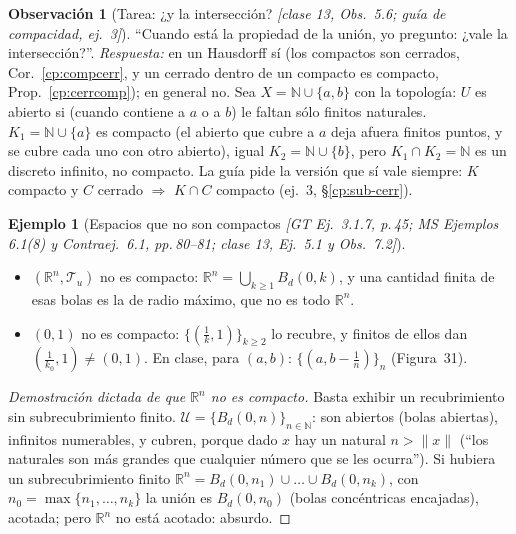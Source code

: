 \documentclass[11pt,a4paper]{article}
\newenvironment{lista}{\leavevmode\begin{itemize}[leftmargin=1.5em,itemsep=1pt,topsep=2pt,parsep=0pt]}{\end{itemize}}
\theoremstyle{definition}
\newtheorem{ejemplo}[definicion]{Ejemplo}
\newtheorem{observacion}[definicion]{Observación}
\theoremstyle{plain}
\newcommand{\fnt}[1]{{\normalfont\small\itshape\color{gray!150!black}[#1]}}
\newcommand{\R}{\mathbb{R}}
\newcommand{\N}{\mathbb{N}}
\newcommand{\Bola}[2]{B_d(#1,#2)}
\newcommand{\norm}[1]{\lVert #1 \rVert}
\newcommand{\tp}{\mathcal{T}}
\begin{document}
\begin{observacion}[Tarea: ¿y la intersección? \fnt{clase 13, Obs.\ 5.6; guía de compacidad, ej.\ 3}]
``Cuando está la propiedad de la unión, yo pregunto: ¿vale la intersección?''. \emph{Respuesta:} en un Hausdorff sí (los compactos son cerrados, Cor.~\ref{cp:compcerr}, y un cerrado dentro de un compacto es compacto, Prop.~\ref{cp:cerrcomp}); en general no. Sea $X=\N\cup\{a,b\}$ con la topología: $U$ es abierto si (cuando contiene a $a$ o a $b$) le faltan sólo finitos naturales. $K_1=\N\cup\{a\}$ es compacto (el abierto que cubre a $a$ deja afuera finitos puntos, y se cubre cada uno con otro abierto), igual $K_2=\N\cup\{b\}$, pero $K_1\cap K_2=\N$ es un discreto infinito, no compacto. La guía pide la versión que sí vale siempre: $K$ compacto y $C$ cerrado $\Rightarrow$ $K\cap C$ compacto (ej.~3, \S\ref{cp:sub-cerr}).
\end{observacion}

\begin{ejemplo}[Espacios que no son compactos \fnt{GT Ej.\ 3.1.7, p.\,45; MS Ejemplos 6.1(8) y Contraej.\ 6.1, pp.\,80--81; clase 13, Ej.\ 5.1 y Obs.\ 7.2}]\label{cp:nocomp}
\begin{lista}
\item $(\R^n,\tp_u)$ no es compacto: $\R^n=\bigcup_{k\ge1}\Bola{0}{k}$, y una cantidad finita de esas bolas es la de radio máximo, que no es todo $\R^n$.
\item $(0,1)$ no es compacto: $\{(\tfrac1k,1)\}_{k\ge2}$ lo recubre, y finitos de ellos dan $(\tfrac1{k_0},1)\ne(0,1)$. En clase, para $(a,b)$: $\{(a,b-\frac1n)\}_{n}$ (Figura~31).
\end{lista}
\end{ejemplo}

\begin{proof}[Demostración dictada de que $\R^n$ no es compacto]
Basta exhibir un recubrimiento sin subrecubrimiento finito. $\mathcal U=\{\Bola{0}{n}\}_{n\in\N}$: son abiertos (bolas abiertas), infinitos numerables, y cubren, porque dado $x$ hay un natural $n>\norm x$ (``los naturales son más grandes que cualquier número que se les ocurra''). Si hubiera un subrecubrimiento finito $\R^n=\Bola{0}{n_1}\cup\dots\cup\Bola{0}{n_k}$, con $n_0=\max\{n_1,\dots,n_k\}$ la unión es $\Bola{0}{n_0}$ (bolas concéntricas encajadas), acotada; pero $\R^n$ no está acotado: absurdo.
\end{proof}
\end{document}
